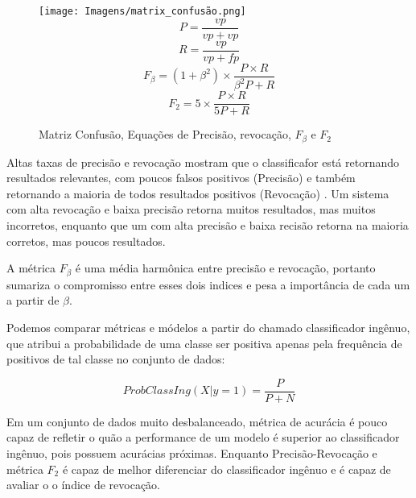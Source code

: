 \begin{figure}[!ht]
\begin{minipage}[c]{0.4\textwidth}
    \end{minipage}%
    \begin{minipage}{0.5\textwidth}
        \texttt{[image: Imagens/matrix\_confusão.png]}
        \begin{equation} P = \frac{vp}{vp + vp} \end{equation}
        \begin{equation}R = \frac{vp}{vp + fp}\end{equation}
        \begin{equation}F_\beta = (1+\beta^2) \times \frac {P \times R}{\beta^2 P + R}\end{equation}
        \begin{equation}F_2 = 5 \times \frac {P \times R}{5 P + R}\end{equation}
        \caption{Matriz Confusão, Equações de Precisão, revocação, $F_\beta$ e $F_2$}        
    \end{minipage}       
    \label{fig:metricas}
\end{figure}

Altas taxas de precisão e revocação mostram que o classificafor está retornando resultados relevantes, com poucos falsos positivos (Precisão) e também retornando a maioria de todos resultados positivos (Revocação) \cite{hastie01statisticallearning}. Um sistema com alta revocação e baixa precisão retorna muitos resultados, mas muitos incorretos, enquanto que um com alta precisão e baixa recisão retorna na maioria corretos, mas poucos resultados.

A métrica $F_\beta$ é uma média harmônica entre precisão e revocação, portanto sumariza o compromisso entre esses dois indices  e pesa a importância de cada um a partir de $\beta$.

Podemos comparar métricas e módelos a partir do chamado classificador ingênuo, que atribui a probabilidade de uma classe ser positiva apenas pela frequência de positivos de tal classe no conjunto de dados:

\begin{equation}
    ProbClassIng(X|y=1) = \frac{P}{P + N}
\end{equation}

Em um conjunto de dados muito desbalanceado, métrica de acurácia é pouco capaz de refletir o quão a performance de um modelo é superior ao classificador ingênuo, pois possuem acurácias próximas. Enquanto Precisão-Revocação e métrica $F_2$ é capaz de melhor diferenciar do classificador ingênuo e é capaz de avaliar o o índice de revocação.

